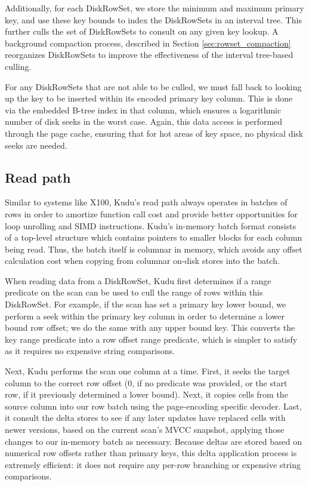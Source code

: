 \documentclass{vldb}
\begin{document}
Additionally, for each DiskRowSet, we store the minimum and maximum primary key, and use these
key bounds to index the DiskRowSets in an interval tree. This further culls
the set of DiskRowSets to consult on any given key lookup. A background compaction process,
described in Section \ref{sec:rowset_compaction} reorganizes DiskRowSets to improve the effectiveness
of the interval tree-based culling.

For any DiskRowSets that are not able to be culled, we must fall back to looking up the
key to be inserted within its encoded primary key column. This is done via the embedded
B-tree index in that column, which ensures a logarithmic number of disk seeks in the worst
case. Again, this data access is performed through the page cache, ensuring that for hot
areas of key space, no physical disk seeks are needed.


\subsection{Read path}

Similar to systems like X100\cite{x100}, Kudu's read path always operates in batches of rows in order to
amortize function call cost and provide better opportunities for loop unrolling and SIMD
instructions. Kudu's in-memory batch format consists of a top-level structure which contains
pointers to smaller blocks for each column being read. Thus, the batch itself is columnar in
memory, which avoids any offset calculation cost when copying from columnar on-disk stores
into the batch.

When reading data from a DiskRowSet, Kudu first determines if a range predicate on the scan
can be used to cull the range of rows within this DiskRowSet. For example, if the scan has
set a primary key lower bound, we perform a seek within the primary key column in order
to determine a lower bound row offset; we do the same with any upper bound key. This converts
the key range predicate into a row offset range predicate, which is simpler to satisfy as it
requires no expensive string comparisons.

Next, Kudu performs the scan one column at a time. First, it seeks the target column to the
correct row offset (0, if no predicate was provided, or the start row, if it previously
determined a lower bound). Next, it copies cells from the source column into our row batch
using the page-encoding specific decoder. Last, it consult the delta stores to see if
any later updates have replaced cells with newer versions, based on the current scan's
MVCC snapshot, applying those changes to our in-memory batch as necessary. Because deltas
are stored based on numerical row offsets rather than primary keys, this delta application
process is extremely efficient: it does not require any per-row branching or expensive
string comparisons.
\end{document}
